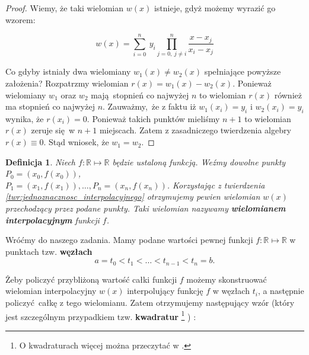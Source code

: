 \documentclass{article}
\newtheorem{definicja}{Definicja}
\begin{document}
\begin{proof}

Wiemy, że taki wielomian $w(x)$ istnieje, gdyż możemy wyrazić go wzorem:

\begin{equation}
w(x) = \sum_{i=0}^n \ y_i \prod_{j=0, \ j \neq i}^n \frac{x-x_j}{x_i-x_j}
\end{equation}

Co gdyby istniały dwa wielomiany $w_1(x) \neq w_2(x)$ spełniające powyższe założenia? Rozpatrzmy wielomian $r(x) = w_1(x) - w_2(x)$. Ponieważ wielomiany $w_1$ oraz $w_2$ mają stopnień co najwyżej $n$ to wielomian $r(x)$ również ma stopnień co najwyżej $n$. Zauważmy, że z faktu iż $w_1(x_i) = y_i$ i $w_2(x_i) = y_i$ wynika, że $r(x_i) = 0$. Ponieważ takich punktów mieliśmy $n+1$ to wielomian $r(x)$ zeruje się w $n+1$ miejscach. Zatem z zasadniczego twierdzenia algebry $r(x) \equiv 0$. Stąd wniosek, że $w_1 = w_2$.
\end{proof}

\begin{definicja}
Niech $f : \mathbb{R} \longmapsto \mathbb{R}$ będzie ustaloną funkcją. Weźmy dowolne punkty $P_0 = (x_0, f(x_0))$,\\ $P_1 = (x_1, f(x_1)), \ldots, P_n = (x_n, f(x_n))$. Korzystając z twierdzenia \ref{twr:jednoznacznosc_interpolacyjnego} otrzymujemy pewien wielomian $w(x)$ przechodzący przez podane punkty. Taki wielomian nazywamy \textbf{wielomianem interpolacyjnym} funkcji $f$.
\end{definicja}

Wróćmy do naszego zadania. Mamy podane wartości pewnej funkcji $f : \mathbb{R} \longmapsto \mathbb{R}$ w punktach tzw. \textbf{węzłach} $$a = t_0 < t_1 < \ldots < t_{n-1} < t_{n} = b.$$

Żeby policzyć przybliżoną wartość całki funkcji $f$ możemy skonstruować wielomian interpolacyjny $w(x)$ interpolujący funkcję $f$ w węzłach $t_i$, a następnie policzyć całkę z tego wielomianu.
Zatem otrzymujemy następujący wzór (który jest szczególnym przypadkiem tzw. \textbf{kwadratur} \footnote{O kwadraturach więcej można przeczytać w \cite{kincaid}.} ) :

\begin{center}
\end{center}
\end{document}
